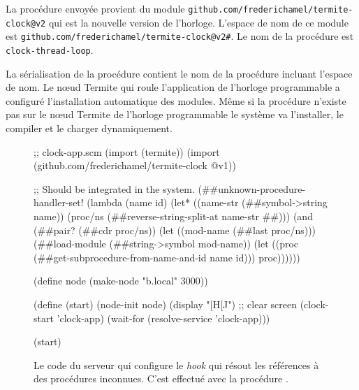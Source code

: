 La procédure envoyée provient du module \texttt{github.com/frederichamel/termite-clock@v2}
qui est la nouvelle version de l'horloge. L'espace de nom de ce module
est \texttt{github.com/frederichamel/termite-clock@v2\#}. Le nom de la procédure
est \texttt{clock-thread-loop}.

La sérialisation de la procédure contient le nom de la procédure incluant
l'espace de nom. Le nœud Termite qui roule l'application de l'horloge
programmable a configuré l'installation automatique des modules. Même si la
procédure n'existe pas sur le nœud Termite de l'horloge programmable le système
va l'installer, le compiler et le charger dynamiquement.\\


\begin{figure}[ht]
  \centering\fontsize{12}{8}
\begin{mplisting}{1}
;; clock-app.scm
(import (termite))
(import (github.com/frederichamel/termite-clock @v1))

;; Should be integrated in the system.
(##unknown-procedure-handler-set!
  (lambda (name id)
    (let* ((name-str (##symbol->string name))
           (proc/ns (##reverse-string-split-at name-str #\#)))
      (and (##pair? (##cdr proc/ns))
           (let ((mod-name (##last proc/ns)))
             (##load-module (##string->symbol mod-name))
             (let ((proc (##get-subprocedure-from-name-and-id name id)))
               proc))))))

(define node (make-node "b.local" 3000))

(define (start)
  (node-init node)
  (display "[H[J") ;; clear screen
  (clock-start 'clock-app)
  (wait-for (resolve-service 'clock-app)))

(start)
\end{mplisting}
  \caption{Le code du serveur qui configure le \textit{hook}
    qui résout les références à des procédures inconnues.
    C'est effectué avec la procédure
    .}
  \vspace*{4ex}
\end{figure}



